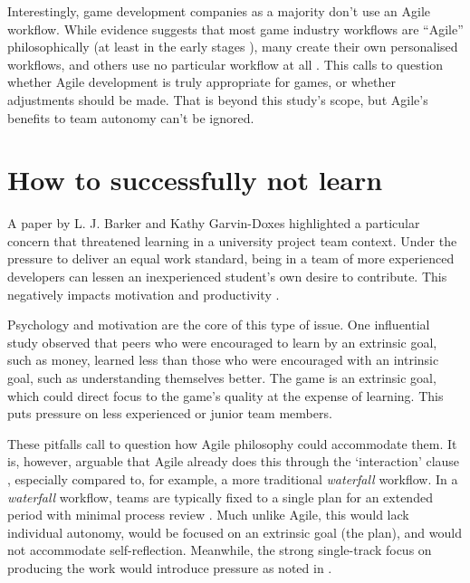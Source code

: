\documentclass{scrartcl}
\begin{document}
Interestingly, game development companies as a majority don't use an Agile workflow. While evidence suggests that most game industry workflows are ``Agile'' philosophically (at least in the early stages \cite{olddays}), many create their own personalised workflows, and others use no particular workflow at all \cite{devstudy}. This calls to question whether Agile development is truly appropriate for games, or whether adjustments should be made. That is beyond this study's scope, but Agile's benefits to team autonomy can't be ignored.


\section{How to successfully not learn}
A paper by L. J. Barker and Kathy Garvin-Doxes \cite{group2003} highlighted a particular concern that threatened learning in a university project team context. Under the pressure to deliver an equal work standard, being in a team of more experienced developers can lessen an inexperienced student's own desire to contribute. This negatively impacts motivation and productivity \cite{group2003, group2005}.

Psychology and motivation are the core of this type of issue. One influential study \cite{motivation} observed that peers who were encouraged to learn by an extrinsic goal, such as money, learned less than those who were encouraged with an intrinsic goal, such as understanding themselves better. The game is an extrinsic goal, which could direct focus to the game's quality at the expense of learning. This puts pressure on less experienced or junior team members.

These pitfalls call to question how Agile philosophy could accommodate them. It is, however, arguable that Agile already does this through the `interaction' clause \cite{manifesto}, especially compared to, for example, a more traditional \textit{waterfall} workflow. In a \textit{waterfall} workflow, teams are typically fixed to a single plan for an extended period with minimal process review \cite{waterfall}. Much unlike Agile, this would lack individual autonomy, would be focused on an extrinsic goal (the plan), and would not accommodate self-reflection. Meanwhile, the strong single-track focus on producing the work would introduce pressure as noted in \cite{group2005}.
\end{document}
